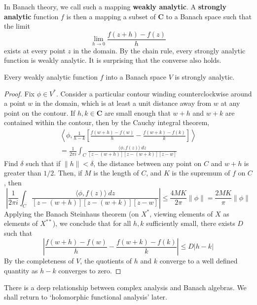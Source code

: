 In Banach theory, we call such a mapping {\bf weakly analytic}. A {\bf strongly analytic} function $f$ is then a mapping a subset of $\mathbf{C}$ to a Banach space such that the limit
%
\[ \lim_{h \to 0} \frac{f(z + h) - f(z)}{h} \]
%
exists at every point $z$ in the domain. By the chain rule, every strongly analytic function is weakly analytic. It is surprising that the converse also holds.

\begin{theorem}
    Every weakly analytic function $f$ into a Banach space $V$ is strongly analytic.
\end{theorem}
\begin{proof}
    Fix $\phi \in V^*$. Consider a particular contour winding counterclockwise around a point $w$ in the domain, which is at least a unit distance away from $w$ at any point on the contour. If $h,k \in \mathbf{C}$ are small enough that $w + h$ and $w + k$ are contained within the contour, then by the Cauchy integral theorem,
    \begin{align*}
        \left\langle \phi, \frac{1}{h-k} \left[ \frac{f(w + h) - f(w)}{h} - \frac{f(w + k) - f(k)}{k} \right] \right\rangle\\
        = \frac{1}{2\pi i} \int_C \frac{\langle \phi, f(z) \rangle\ dz}{[z - (w + h)][z - (w + k)][z - w]}
    \end{align*}
    Find $\delta$ such that if $\| h \| < \delta$, the distance between any point on $C$ and $w + h$ is greater than $1/2$. Then, if $M$ is the length of $C$, and $K$ is the supremum of $f$ on $C$, then
    \[ \left| \frac{1}{2\pi i} \int_C \frac{\langle \phi, f(z) \rangle\ dz}{[z - (w + h)][z - (w + k)][z - w]}\right| \leq \frac{4MK}{2 \pi} \| \phi \| = \frac{2MK}{\pi} \| \phi \| \]
    Applying the Banach Steinhaus theorem (on $X^*$, viewing elements of $X$ as elements of $X^{**}$), we conclude that for all $h,k$ sufficiently small, there exists $D$ such that
    \[ \left| \frac{f(w + h) - f(w)}{h} - \frac{f(w + k) - f(k)}{k} \right| \leq D |h - k| \]
    By the completeness of $V$, the quotients of $h$ and $k$ converge to a well defined quantity as $h - k$ converges to zero.
\end{proof}

There is a deep relationship between complex analysis and Banach algebras. We shall return to `holomorphic functional analysis' later.

